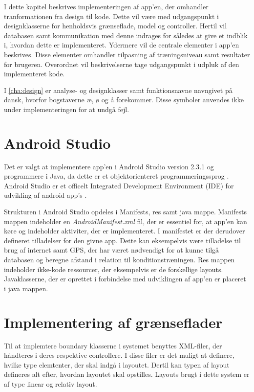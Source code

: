 I dette kapitel beskrives implementeringen af app'en, der omhandler tranformationen fra design til kode. Dette vil være med udgangspunkt i designklasserne for henholdsvis grænseflade, model og controller. Hertil vil databasen samt kommunikation med denne indrages for således at give et indblik i, hvordan dette er implementeret. Ydermere vil de centrale elementer i app'en beskrives. Disse elementer omhandler tilpasning af træningsniveau samt resultater for brugeren. Overordnet vil beskrivelserne tage udgangspunkt i udpluk af den implementeret kode.

I \autoref{cha:design} er analyse- og designklasser samt funktionsnavne navngivet på dansk, hvorfor bogstaverne æ, ø og å forekommer. Disse symboler anvendes ikke under implementeringen for at undgå fejl.

\section{Android Studio}
Det er valgt at implementere app'en i Android Studio version 2.3.1 og programmere i Java, da dette er et objektorienteret programmeringssprog \citep{Brahma2015}. Android Studio er et officelt Integrated Development Environment (IDE) for udvikling af android app's \citep{android2017}.

Strukturen i Android Studio opdeles i Manifests, res samt java mappe. Manifests mappen indeholder en \textit{AndroidManifest.xml} fil, der er essentiel for, at app'en kan køre og indeholder aktiviter, der er implementeret. I manifestet er der derudover defineret tilladelser for den givne app. Dette kan eksempelvis være tilladelse til brug af internet samt GPS, der har været nødvendigt for at kunne tilgå databasen og beregne afstand i relation til konditionstræningen. 
Res mappen indeholder ikke-kode ressourcer, der eksempelvis er de forskellige layouts.
Javaklasserne, der er oprettet i forbindelse med udviklingen af app'en er placeret i java mappen.\citep{android2017}
 

\section{Implementering af grænseflader}
Til at implemtere boundary klasserne i systemet benyttes XML-filer, der håndteres i deres respektive controllere. I disse filer er det muligt at definere, hvilke type elemtenter, der skal indgå i layoutet. Dertil kan typen af layout defineres alt efter, hvordan layoutet skal opstilles. Layouts brugt i dette system er af type linear og relativ layout.  

